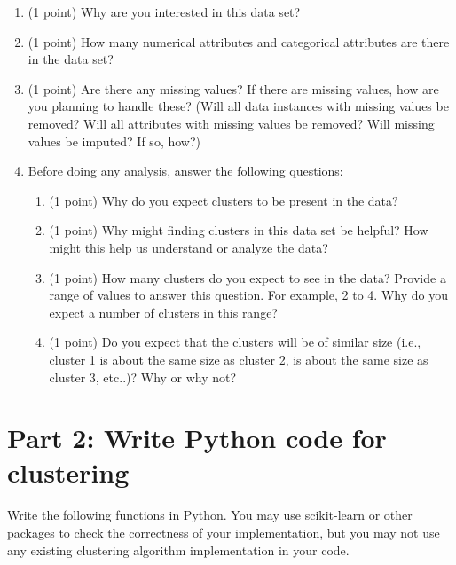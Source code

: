 \documentclass[11pt]{article}
\begin{document}
\begin{enumerate}

    \item (1 point) Why are you interested in this data set?

    \item (1 point) How many numerical attributes and categorical attributes are
    there in the data set?

    \item (1 point) Are there any missing values? If there are missing values,
    how are you planning to handle these?  (Will all data instances with missing
    values be removed? Will all attributes with missing values be removed? Will
    missing values be imputed? If so, how?)

    \item Before doing any analysis, answer the following questions:
    \begin{enumerate}

        \item (1 point) Why do you expect clusters to be present in the data?

        \item (1 point) Why might finding clusters in this data set be helpful?
        How might this help us understand or analyze the data?

        \item (1 point) How many clusters do you expect to see in the data?
        Provide a range of values to answer this question. For example, 2 to 4.
        Why do you expect a number of clusters in this range?

        \item (1 point) Do you expect that the clusters will be of similar size
        (i.e., cluster 1 is about the same size as cluster 2, is about the same
        size as cluster 3, etc..)? Why or why not?

    \end{enumerate}

\end{enumerate}

\section*{Part 2: Write Python code for clustering}

Write the following functions in Python. You may use scikit-learn or other
packages to check the correctness of your implementation, but you may not use
any existing clustering algorithm implementation in your code.
\end{document}
